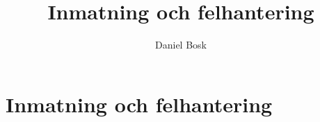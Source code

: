 \documentclass[a4paper,10pt,oneside,openright,
               oldfontcommands]{memoir}
\begin{document}
\title{%
  Inmatning och felhantering
}
\author{Daniel Bosk}

\maketitle

\begin{abstract}
  
\end{abstract}

\clearpage

\tableofcontents*

\chapter{Inmatning och felhantering}



\appendix


\printbibliography
\end{document}

